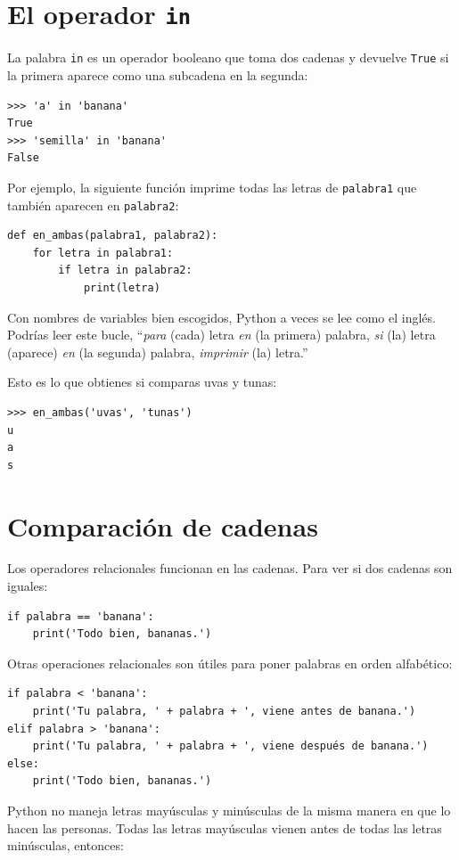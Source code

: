 \documentclass[10pt]{book}
\begin{document}
\section{El operador {\tt in}}
\label{inboth}

La palabra {\tt in} es un operador booleano que toma dos cadenas y
devuelve {\tt True} si la primera aparece como una subcadena en la segunda:

\begin{verbatim}
>>> 'a' in 'banana'
True
>>> 'semilla' in 'banana'
False
\end{verbatim}
%
Por ejemplo, la siguiente función imprime todas las
letras de {\tt palabra1} que también aparecen en {\tt palabra2}:

\begin{verbatim}
def en_ambas(palabra1, palabra2):
    for letra in palabra1:
        if letra in palabra2:
            print(letra)
\end{verbatim}
%
Con nombres de variables bien escogidos,
Python a veces se lee como el inglés.  Podrías leer
este bucle, ``{\em para} (cada) letra {\em en} (la primera) palabra, {\em si} (la) letra
(aparece) {\em en} (la segunda) palabra, {\em imprimir} (la) letra.''

Esto es lo que obtienes si comparas uvas y tunas:

\begin{verbatim}
>>> en_ambas('uvas', 'tunas')
u
a
s
\end{verbatim}
%

\section{Comparación de cadenas}

Los operadores relacionales funcionan en las cadenas.  Para ver si dos cadenas son iguales:

\begin{verbatim}
if palabra == 'banana':
    print('Todo bien, bananas.')
\end{verbatim}
%
Otras operaciones relacionales son útiles para poner palabras en orden
alfabético:

\begin{verbatim}
if palabra < 'banana':
    print('Tu palabra, ' + palabra + ', viene antes de banana.')
elif palabra > 'banana':
    print('Tu palabra, ' + palabra + ', viene después de banana.')
else:
    print('Todo bien, bananas.')
\end{verbatim}
%
Python no maneja letras mayúsculas y minúsculas de la misma manera en que
lo hacen las personas.  Todas las letras mayúsculas vienen antes de todas las
letras minúsculas, entonces:
\end{document}
